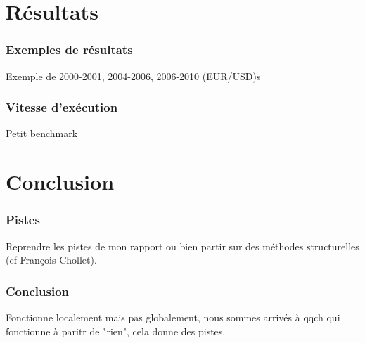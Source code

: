 \documentclass{beamer}
\begin{document}
	\section{Résultats}
	
	\begin{frame}
		\frametitle{Exemples de résultats}
		Exemple de 2000-2001, 2004-2006, 2006-2010 (EUR/USD)s
	\end{frame}

	\begin{frame}
		\frametitle{Vitesse d'exécution}
		Petit benchmark
	\end{frame}

	\section{Conclusion}
	
	\begin{frame}
		\frametitle{Pistes}
		Reprendre les pistes de mon rapport ou bien partir sur des méthodes structurelles (cf François Chollet).
	\end{frame}

	\begin{frame}
		\frametitle{Conclusion}
		Fonctionne localement mais pas globalement, nous sommes arrivés à qqch qui fonctionne à paritr de "rien", cela donne des pistes.
	\end{frame}
	
\end{document}
